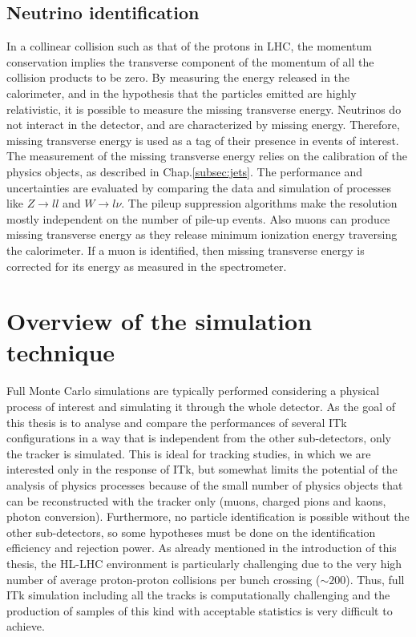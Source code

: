 \documentclass[a4paper,twoside,12pt]{book}
\begin{document}
\section{Neutrino identification}
In a collinear collision such as that of the protons in LHC, the momentum conservation 
implies the transverse component of the momentum of all the collision products to be zero. 
By measuring the energy released in the calorimeter, and in the hypothesis that the particles emitted are highly relativistic, it is possible to measure the missing transverse energy. Neutrinos do not interact in the detector, and are characterized by missing energy. Therefore, 
missing transverse energy is used as a tag of their presence in events of interest. The measurement of the missing transverse energy relies on the calibration of the 
physics objects, as described in Chap.\ref{subsec:jets}. The performance and uncertainties are 
evaluated by comparing the data and simulation of processes like $Z \rightarrow ll$ and 
$W \rightarrow l\nu$. The pileup suppression algorithms make the resolution mostly independent on
the number of pile-up events. Also muons can produce missing transverse energy as they release minimum 
ionization energy traversing the calorimeter. If a muon is identified, then missing transverse energy is
corrected for its energy as measured in the spectrometer.

\clearpage

\chapter{Overview of the simulation technique}\label{sec:simulation}
Full Monte Carlo simulations are typically performed considering 
a physical process of interest and simulating it through the whole detector. As the goal of this
thesis is to analyse and compare the performances of several ITk configurations in a way that
is independent from the other sub-detectors, only the tracker is simulated. This is 
ideal for tracking studies, in which we are interested only in the response of ITk, but
somewhat 
limits the potential of the analysis of physics processes because of the small number of physics objects that can be reconstructed with the tracker only (muons, charged pions and kaons, photon conversion). Furthermore, no particle identification is possible without the other sub-detectors, so some
 hypotheses must be done on the identification efficiency and rejection power.
As already mentioned in the introduction of this thesis, the HL-LHC environment is particularly
challenging due to the very high number of average proton-proton collisions per bunch crossing ($\sim 200$). Thus, full ITk simulation including all the tracks is computationally challenging 
and the production of samples of this kind with acceptable statistics is very difficult
to achieve.\\
\end{document}

